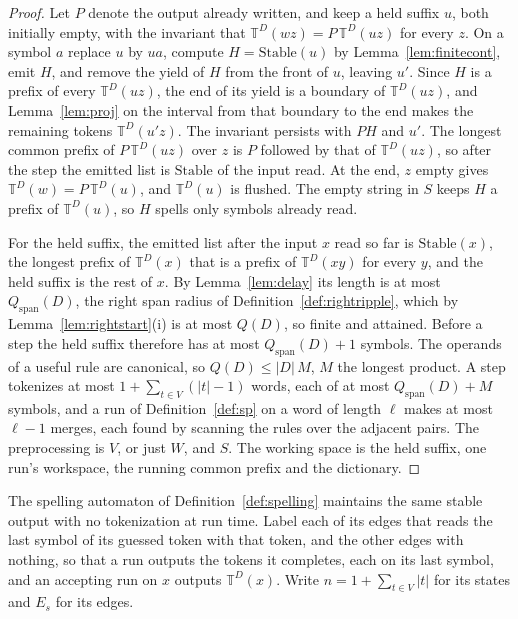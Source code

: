 \documentclass[11pt,a4paper]{article}
\theoremstyle{definition}
\theoremstyle{plain}
\newcommand{\T}{\mathbb{T}}
\newcommand{\Stable}{\mathrm{Stable}}
\begin{document}
\begin{proof}
Let \(P\) denote the output already written, and keep a held suffix \(u\), both initially empty, with the invariant that
\(\T^D(wz) = P\,\T^D(uz)\) for every \(z\). On a symbol \(a\) replace \(u\) by \(ua\), compute \(H = \Stable(u)\) by
Lemma~\ref{lem:finitecont}, emit \(H\), and remove the yield of \(H\) from the front of \(u\), leaving \(u'\). Since
\(H\) is a prefix of every \(\T^D(uz)\), the end of its yield is a boundary of \(\T^D(uz)\), and Lemma~\ref{lem:proj} on
the interval from that boundary to the end makes the remaining tokens \(\T^D(u'z)\). The invariant persists with \(PH\)
and \(u'\). The longest common prefix of \(P\,\T^D(uz)\) over \(z\) is \(P\) followed by that of \(\T^D(uz)\), so after
the step the emitted list is \(\Stable\) of the input read. At the end, \(z\) empty gives \(\T^D(w) = P\,\T^D(u)\), and
\(\T^D(u)\) is flushed. The empty string in \(S\) keeps \(H\) a prefix of \(\T^D(u)\), so \(H\) spells only symbols
already read.

For the held suffix, the emitted list after the input \(x\) read so far is \(\Stable(x)\), the longest prefix of
\(\T^D(x)\) that is a prefix of \(\T^D(xy)\) for every \(y\), and the held suffix is the rest of \(x\). By
Lemma~\ref{lem:delay} its length is at most \(Q_{\mathrm{span}}(D)\), the right span radius of
Definition~\ref{def:rightripple}, which by Lemma~\ref{lem:rightstart}(i) is at most \(Q(D)\), so finite and attained.
Before a step the held suffix therefore has at most \(Q_{\mathrm{span}}(D) + 1\) symbols. The operands of a useful rule
are canonical, so \(Q(D) \le |D|\,M\), \(M\) the longest product. A step tokenizes at most
\(1 + \sum_{t \in V} (|t| - 1)\) words, each of at most \(Q_{\mathrm{span}}(D) + M\) symbols, and a run of
Definition~\ref{def:sp} on a word of length \(\ell\) makes at most \(\ell - 1\) merges, each found by scanning the rules
over the adjacent pairs. The preprocessing is \(V\), or just \(W\), and \(S\). The working space is the held suffix, one
run's workspace, the running common prefix and the dictionary.
\end{proof}

The spelling automaton of Definition~\ref{def:spelling} maintains the same stable output with no tokenization at run
time. Label each of its edges that reads the last symbol of its guessed token with that token, and the other edges with
nothing, so that a run outputs the tokens it completes, each on its last symbol, and an accepting run on \(x\) outputs
\(\T^D(x)\). Write \(n = 1 + \sum_{t \in V} |t|\) for its states and \(E_s\) for its edges.
\end{document}
